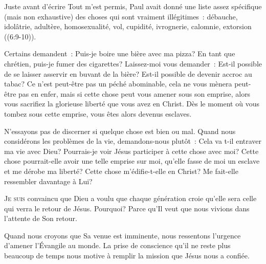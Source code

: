 Juste avant d'écrire \og Tout m'est permis, \fg{}
 Paul avait donné une liste assez spécifique
 (mais non exhaustive) des choses qui sont vraiment illégitimes~:
 débauche, idolâtrie, adultère, homosexualité,
 vol, cupidité, ivrognerie, calomnie, extorsion
 ((6:9-10)).


Certains demandent~:
 \og Puis-je boire une bière avec ma pizza?
 En tant que chrétien, puis-je fumer des cigarettes? \fg{}
 Laissez-moi vous demander~: 
 \og Est-il possible de se laisser asservir en buvant de la bière?
 Est-il possible de devenir accroc au tabac? \fg{}
 Ce n'est peut-être pas un péché abominable,
 cela ne vous mènera peut-être pas en enfer,
 mais si cette chose peut vous amener sous son emprise,
 alors vous sacrifiez la glorieuse liberté que vous avez en Christ.
 Dès le moment où vous tombez sous cette emprise,
 vous êtes alors devenus esclaves.

N'essayons pas de discerner si quelque chose est bien ou mal.
 Quand nous considérons les problèmes de la vie,
 demandons-nous plutôt~: \og {}
 Cela va t-il entraver ma vie avec Dieu?
 Pourrais-je voir Jésus participer à cette chose avec moi?
 Cette chose pourrait-elle avoir une telle emprise sur moi,
 qu'elle fasse de moi un esclave et me dérobe ma liberté?
 Cette chose m'édifie-t-elle en Christ?
 Me fait-elle ressembler davantage à Lui? \fg{}

\dvrule







\lettrine{J}{e suis} convaincu
 que Dieu a voulu que chaque génération
 croie qu'elle sera celle qui verra le retour de Jésus.
 Pourquoi? Parce qu'Il veut que nous vivions
 dans l'attente de Son retour.

Quand nous croyons que Sa venue est imminente,
 nous ressentons l'urgence d'amener l'Évangile au monde.
 La prise de conscience qu'il ne reste plus beaucoup
 de temps nous motive à remplir la mission que Jésus nous a confiée. 


